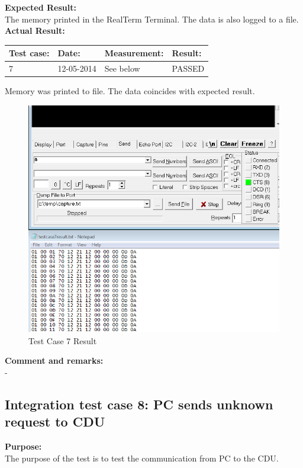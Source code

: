 \textbf{Expected Result:}\\
The memory printed in the RealTerm Terminal. The data is also logged to a file.\\

\textbf{Actual Result:}\\
\begin{table}[H]
\centering
\begin{tabular}{|p{2cm}|p{2cm}|p{3cm}|p{2cm}|}\hline
\textbf{Test case:} & \textbf{Date:} & \textbf{Measurement:} & \textbf{Result:} \\ \hline
7 & 12-05-2014 & See below & PASSED \\ \hline
\end{tabular}
\end{table}
Memory was printed to file. The data coincides with expected result.
\begin{figure}[H]
\centering
\includegraphics[width=1\textwidth]{billeder/inte07}
\caption{Test Case 7 Result}
\label{fig:InteTestCase7}
\end{figure}

\textbf{Comment and remarks:}\\
-\\

\subsection{Integration test case 8: PC sends unknown request to CDU}
\textbf{Purpose:}\\
The purpose of the test is to test the communication from PC to the CDU.\\

